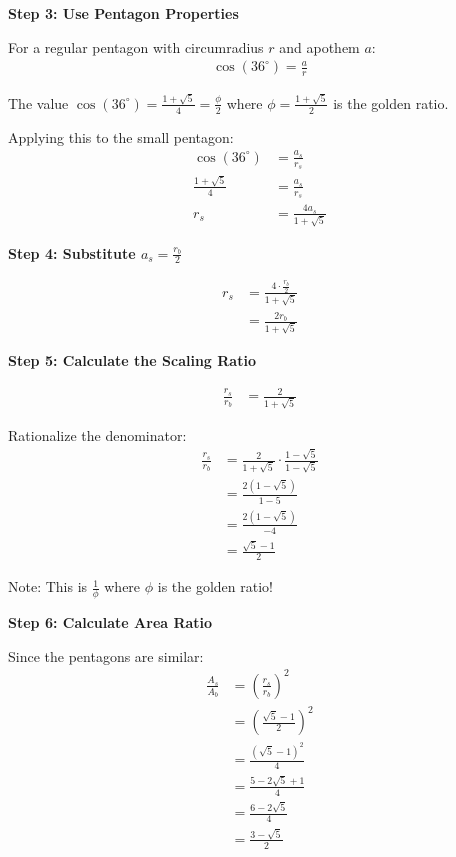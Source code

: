 \documentclass[12pt]{article}
\begin{document}
\begin{techniquesbox}
\begin{itemize}[leftmargin=*]
    \textbf{Step 3: Use Pentagon Properties}
    
    For a regular pentagon with circumradius $r$ and apothem $a$:
    \begin{align*}
    \cos(36^\circ) = \frac{a}{r}
    \end{align*}
    
    The value $\cos(36^\circ) = \frac{1+\sqrt{5}}{4} = \frac{\phi}{2}$ where $\phi = \frac{1+\sqrt{5}}{2}$ is the golden ratio.
    
    Applying this to the small pentagon:
    \begin{align*}
    \cos(36^\circ) &= \frac{a_s}{r_s}\\
    \frac{1+\sqrt{5}}{4} &= \frac{a_s}{r_s}\\
    r_s &= \frac{4a_s}{1+\sqrt{5}}
    \end{align*}
    
    \textbf{Step 4: Substitute $a_s = \frac{r_b}{2}$}
    
    \begin{align*}
    r_s &= \frac{4 \cdot \frac{r_b}{2}}{1+\sqrt{5}}\\
    &= \frac{2r_b}{1+\sqrt{5}}
    \end{align*}
    
    \textbf{Step 5: Calculate the Scaling Ratio}
    
    \begin{align*}
    \frac{r_s}{r_b} &= \frac{2}{1+\sqrt{5}}
    \end{align*}
    
    Rationalize the denominator:
    \begin{align*}
    \frac{r_s}{r_b} &= \frac{2}{1+\sqrt{5}} \cdot \frac{1-\sqrt{5}}{1-\sqrt{5}}\\
    &= \frac{2(1-\sqrt{5})}{1-5}\\
    &= \frac{2(1-\sqrt{5})}{-4}\\
    &= \frac{\sqrt{5}-1}{2}
    \end{align*}
    
    Note: This is $\frac{1}{\phi}$ where $\phi$ is the golden ratio!
    
    \textbf{Step 6: Calculate Area Ratio}
    
    Since the pentagons are similar:
    \begin{align*}
    \frac{A_s}{A_b} &= \left(\frac{r_s}{r_b}\right)^2\\
    &= \left(\frac{\sqrt{5}-1}{2}\right)^2\\
    &= \frac{(\sqrt{5}-1)^2}{4}\\
    &= \frac{5 - 2\sqrt{5} + 1}{4}\\
    &= \frac{6 - 2\sqrt{5}}{4}\\
    &= \frac{3 - \sqrt{5}}{2}
    \end{align*}
    

\end{itemize}
\end{techniquesbox}
\end{document}

